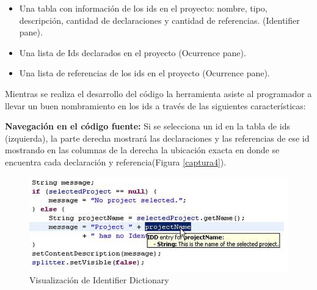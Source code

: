 \documentclass[12pt]{report}
\begin{document}
\begin{itemize}
\itemsep0em%
\item Una tabla con información de los ids en el proyecto: nombre, tipo, descripción, cantidad de declaraciones y cantidad de referencias. (Identifier pane).
\item Una lista de Ids declarados en el proyecto (Ocurrence pane).
\item Una lista de referencias de los ids en el proyecto (Ocurrence pane).
\end{itemize}

Mientras se realiza el desarrollo del código la herramienta asiste al programador a llevar un buen nombramiento en los ids a través de las siguientes características:

\textbf{Navegación en el código fuente:} Si se selecciona un id en la tabla de ids (izquierda), la parte derecha mostrará las declaraciones y las referencias de ese id mostrando en las columnas de la derecha la ubicación exacta en donde se encuentra cada declaración y referencia(Figura \ref{captura4}).


%

\begin{figure}[t] %
\centering
\includegraphics[scale= 0.80]{./idd_7.png}
\caption{Visualización de Identifier Dictionary}
\label{captura8}
\end{figure}
\end{document}
